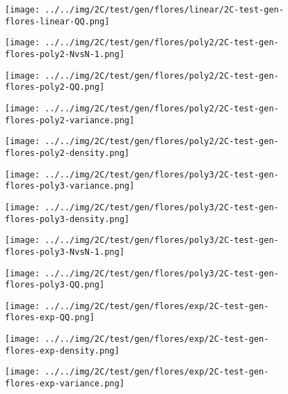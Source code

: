 \begin{figure}[H]
\centering	\texttt{[image: ../../img/2C/test/gen/flores/linear/2C-test-gen-flores-linear-QQ.png]}
\end{figure}
\begin{figure}[H]
\centering	\texttt{[image: ../../img/2C/test/gen/flores/poly2/2C-test-gen-flores-poly2-NvsN-1.png]}
\end{figure}
\begin{figure}[H]
\centering	\texttt{[image: ../../img/2C/test/gen/flores/poly2/2C-test-gen-flores-poly2-QQ.png]}
\end{figure}
\begin{figure}[H]
\centering	\texttt{[image: ../../img/2C/test/gen/flores/poly2/2C-test-gen-flores-poly2-variance.png]}
\end{figure}
\begin{figure}[H]
\centering	\texttt{[image: ../../img/2C/test/gen/flores/poly2/2C-test-gen-flores-poly2-density.png]}
\end{figure}
\begin{figure}[H]
\centering	\texttt{[image: ../../img/2C/test/gen/flores/poly3/2C-test-gen-flores-poly3-variance.png]}
\end{figure}
\begin{figure}[H]
\centering	\texttt{[image: ../../img/2C/test/gen/flores/poly3/2C-test-gen-flores-poly3-density.png]}
\end{figure}
\begin{figure}[H]
\centering	\texttt{[image: ../../img/2C/test/gen/flores/poly3/2C-test-gen-flores-poly3-NvsN-1.png]}
\end{figure}
\begin{figure}[H]
\centering	\texttt{[image: ../../img/2C/test/gen/flores/poly3/2C-test-gen-flores-poly3-QQ.png]}
\end{figure}
\begin{figure}[H]
\centering	\texttt{[image: ../../img/2C/test/gen/flores/exp/2C-test-gen-flores-exp-QQ.png]}
\end{figure}
\begin{figure}[H]
\centering	\texttt{[image: ../../img/2C/test/gen/flores/exp/2C-test-gen-flores-exp-density.png]}
\end{figure}
\begin{figure}[H]
\centering	\texttt{[image: ../../img/2C/test/gen/flores/exp/2C-test-gen-flores-exp-variance.png]}
\end{figure}
